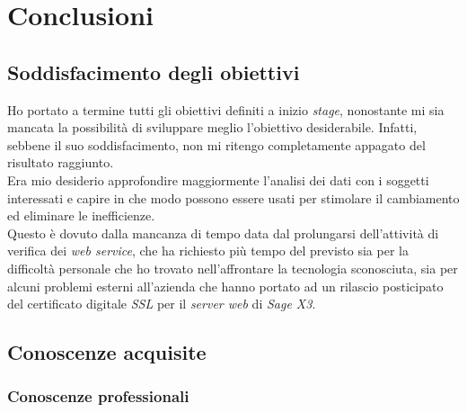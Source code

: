 

\chapter{Conclusioni}
\label{cap:conclusioni}



\section{Soddisfacimento degli obiettivi}

Ho portato a termine tutti gli obiettivi definiti a inizio \textit{stage}, nonostante mi sia mancata la possibilità di sviluppare meglio l'obiettivo desiderabile.
Infatti, sebbene il suo soddisfacimento, non mi ritengo completamente appagato del risultato raggiunto.\\
Era mio desiderio approfondire maggiormente l'analisi dei dati con i soggetti interessati e capire in che modo possono essere usati per stimolare il cambiamento ed eliminare le inefficienze.\\
Questo è dovuto dalla mancanza di tempo data dal prolungarsi dell'attività di verifica dei \textit{web service}, che ha richiesto più tempo del previsto sia per la difficoltà personale che ho trovato nell'affrontare la tecnologia sconosciuta, sia per alcuni problemi esterni all'azienda che hanno portato ad un rilascio posticipato del certificato digitale \textit{SSL} per il \textit{server web} di \textit{Sage X3}.




\section{Conoscenze acquisite}

\subsection{Conoscenze professionali}

